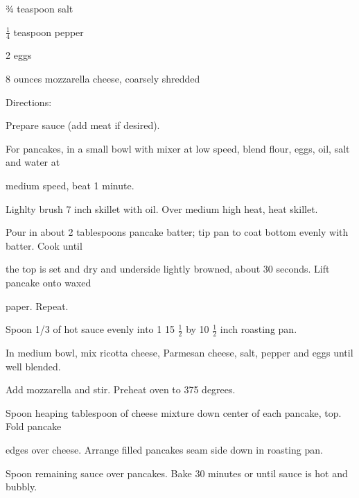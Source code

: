 \documentclass[a4paper,portrait,12pt]{book}
\begin{document}
¾ teaspoon salt




$\frac{1}{4}$ teaspoon pepper




2 eggs




8 ounces mozzarella cheese, coarsely shredded




Directions:




Prepare sauce (add meat if desired).




For pancakes, in a small bowl with mixer at low speed, blend flour, eggs, oil, salt and water at




medium speed, beat 1 minute.




Lighlty brush 7 inch skillet with oil. Over medium high heat, heat skillet.




Pour in about 2 tablespoons pancake batter; tip pan to coat bottom evenly with batter. Cook until




the top is set and dry and underside lightly browned, about 30 seconds. Lift pancake onto waxed




paper. Repeat.




Spoon 1/3 of hot sauce evenly into 1 15 $\frac{1}{2}$ by 10 $\frac{1}{2}$ inch roasting pan.




In medium bowl, mix ricotta cheese, Parmesan cheese, salt, pepper and eggs until well blended.




Add mozzarella and stir. Preheat oven to 375 degrees.




Spoon heaping tablespoon of cheese mixture down center of each pancake, top. Fold pancake




edges over cheese. Arrange filled pancakes seam side down in roasting pan.




Spoon remaining sauce over pancakes. Bake 30 minutes or until sauce is hot and bubbly.
\end{document}
